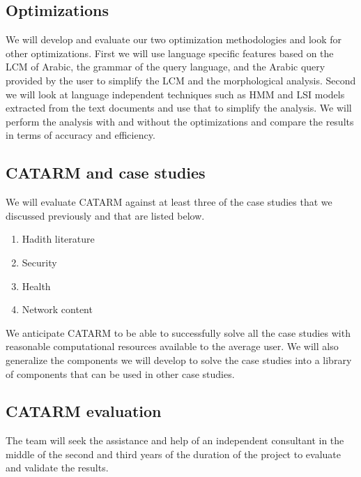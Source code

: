 \documentclass[12pt]{article}
\begin{document}
{\subsection{Optimizations}

We will develop and evaluate our two optimization methodologies
and look for other optimizations. 
First we will use language specific features based on the 
LCM of Arabic, the grammar of the query language, and 
the Arabic query provided by the user to simplify 
the LCM and the morphological analysis. 
Second we will look at language independent techniques
such as HMM and LSI models extracted from the 
text documents and use that to simplify the analysis. 
We will perform the analysis with and without the optimizations
and compare the results in terms of accuracy and efficiency. 

\subsection{CATARM and case studies }

We will evaluate CATARM against at least three of the case studies
that we discussed previously and that are listed below. 
\begin{enumerate}
\item Hadith literature
\item Security
\item Health
\item Network content
\end{enumerate}

We anticipate CATARM to be able to successfully solve all the case
studies with reasonable computational resources available to the 
average user. 
We will also generalize the components we will develop to solve
the case studies into a library of components that can be used
in other case studies. 

\subsection{CATARM evaluation } 

The team will seek the assistance and help of an independent 
consultant in the middle of the second and third years of 
the duration of the project to evaluate and validate the results.

}
\end{document}
